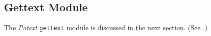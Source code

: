 \subsection{Gettext Module}
\label{subsec:potext_gettext_module}

   The \textsl{Potext} \texttt{gettext} module is discussed in the next
   section.
   (See .)

